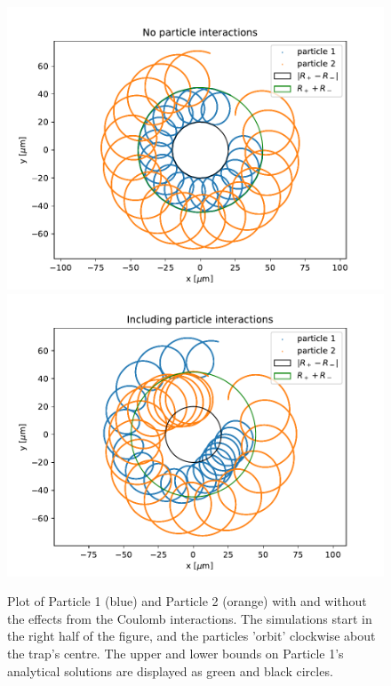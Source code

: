 \begin{figure}
\centering
\includegraphics[scale=0.7]{../figures/xy_plane_noint.pdf}
\includegraphics[scale=0.7]{../figures/xy_plane_int.pdf}
\caption{Plot of Particle 1 (blue) and Particle 2 (orange) with and without
the effects from the Coulomb interactions. The simulations start in the right half of the
figure, and the particles 'orbit' clockwise about the trap's centre. The upper and lower bounds on Particle 1's analytical solutions are displayed as green and black circles.} %
\label{fig:xy_plane}
\end{figure}

